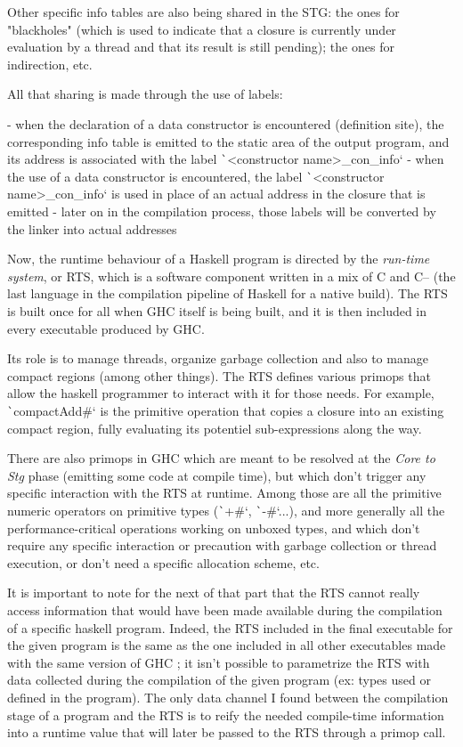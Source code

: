 \documentclass[english]{jflart}
\begin{document}
Other specific info tables are also being shared in the STG: the ones for "blackholes" (which is used to indicate that a closure is currently under evaluation by a thread and that its result is still pending); the ones for indirection, etc.

All that sharing is made through the use of labels:

- when the declaration of a data constructor is encountered (definition site), the corresponding info table is emitted to the static area of the output program, and its address is associated with the label \texttt`<constructor name>_con_info`
- when the use of a data constructor is encountered, the label \texttt`<constructor name>_con_info` is used in place of an actual address in the closure that is emitted
- later on in the compilation process, those labels will be converted by the linker into actual addresses

Now, the runtime behaviour of a Haskell program is directed by the \emph{run-time system}, or RTS, which is a software component written in a mix of C and C-- (the last language in the compilation pipeline of Haskell for a native build). The RTS is built once for all when GHC itself is being built, and it is then included in every executable produced by GHC.

Its role is to manage threads, organize garbage collection and also to manage compact regions (among other things). The RTS defines various primops that allow the haskell programmer to interact with it for those needs. For example, \texttt`compactAdd#` is the primitive operation that copies a closure into an existing compact region, fully evaluating its potentiel sub-expressions along the way.

There are also primops in GHC which are meant to be resolved at the \emph{Core to Stg} phase (emitting some code at compile time), but which don't trigger any specific interaction with the RTS at runtime. Among those are all the primitive numeric operators on primitive types (\texttt`+#`, \texttt`-#`...), and more generally all the performance-critical operations working on unboxed types, and which don't require any specific interaction or precaution with garbage collection or thread execution, or don't need a specific allocation scheme, etc.

It is important to note for the next of that part that the RTS cannot really access information that would have been made available during the compilation of a specific haskell program. Indeed, the RTS included in the final executable for the given program is the same as the one included in all other executables made with the same version of GHC ; it isn't possible to parametrize the RTS with data collected during the compilation of the given program (ex: types used or defined in the program). The only data channel I found between the compilation stage of a program and the RTS is to reify the needed compile-time information into a runtime value that will later be passed to the RTS through a primop call.
\end{document}
